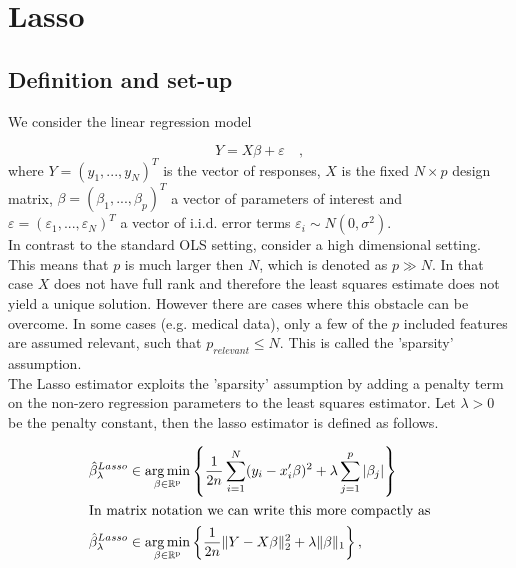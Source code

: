 \documentclass{article}
\theoremstyle{definition}
\DeclareMathOperator*{\argmin}{arg\,min}
\begin{document}


\newpage

\section{Lasso}
\subsection{Definition and set-up}
We consider the linear regression model

\begin{equation}
	Y=X\beta+\varepsilon\quad,
\end{equation}
%
where $Y=(y_{1},...,y_{N})^T$ is the vector of responses, $X$ is the fixed $N \times p$ design matrix, $\beta=(\beta_1,...,\beta_p)^T$ a vector of parameters of interest and $\varepsilon=(\varepsilon_1,...,\varepsilon_N)^T$ a vector of i.i.d. error terms $\varepsilon_i \sim N(0,\sigma^2)$.\\
In contrast to the standard OLS setting, consider a high dimensional setting. This means that $p$ is much larger then $N$, which is denoted as $p\gg N$. In that case $X$ does not have full rank and therefore the least squares estimate does not yield a unique solution. However there are cases where this obstacle can be overcome. In some cases (e.g. medical data), only a few of the $p$ included features are assumed relevant, such that $p_{relevant}\leq N$. This is called the 'sparsity' assumption.\\
The Lasso estimator exploits the 'sparsity' assumption by adding a penalty term on the non-zero regression parameters to the least squares estimator. Let $\lambda>0$ be the penalty constant, then the lasso estimator is defined as follows.

\begin{align}
\hat{\beta}_{\lambda}^{Lasso}&\in\argmin_{\beta \in\rm \mathbb{R}^p} \left \{ \frac{1}{2n}  \sum_{i=1}^{N}(y_{i}-x_{i}'\beta)^2+\lambda \sum_{j=1}^p|\beta_j| \right\}\\
\shortintertext{In matrix notation we can write this more compactly as}
\hat{\beta}_{\lambda}^{Lasso}&\in\argmin_{\beta \in\rm \mathbb{R}^p}  \left\{\frac{1}{2n} \| Y-X\beta\|_2^2+\lambda \| \beta\|_1 \right\}, \label{LassoLambda}
\end{align} 
\end{document}
